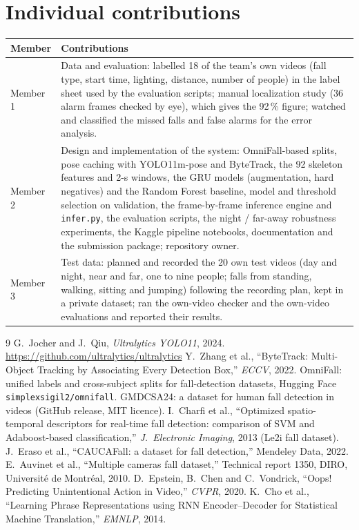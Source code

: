 \documentclass[11pt,a4paper]{article}
\newcommand{\code}[1]{\texttt{\small #1}}
\begin{document}
\section{Individual contributions}
\begin{table}[H]\centering\small
\begin{tabularx}{\textwidth}{@{}lX@{}}\toprule
\textbf{Member} & \textbf{Contributions}\\ \midrule
Member 1 & Data and evaluation: labelled 18 of the team's own videos (fall type, start time, lighting, distance, number of people) in the label sheet used by the evaluation scripts; manual localization study (36 alarm frames checked by eye), which gives the 92\,\% figure; watched and classified the missed falls and false alarms for the error analysis.\\[2pt]
Member 2 & Design and implementation of the system: OmniFall-based splits, pose caching with YOLO11m-pose and ByteTrack, the 92 skeleton features and 2-s windows, the GRU models (augmentation, hard negatives) and the Random Forest baseline, model and threshold selection on validation, the frame-by-frame inference engine and \code{infer.py}, the evaluation scripts, the night / far-away robustness experiments, the Kaggle pipeline notebooks, documentation and the submission package; repository owner.\\[2pt]
Member 3 & Test data: planned and recorded the 20 own test videos (day and night, near and far, one to nine people; falls from standing, walking, sitting and jumping) following the recording plan, kept in a private dataset; ran the own-video checker and the own-video evaluations and reported their results.\\
\bottomrule\end{tabularx}
\end{table}

\begin{thebibliography}{9}\small
{} G.~Jocher and J.~Qiu, \emph{Ultralytics YOLO11}, 2024. \url{https://github.com/ultralytics/ultralytics}
 Y.~Zhang et al., ``ByteTrack: Multi-Object Tracking by Associating Every Detection Box,'' \emph{ECCV}, 2022.
 OmniFall: unified labels and cross-subject splits for fall-detection datasets, Hugging Face \code{simplexsigil2/omnifall}.
 GMDCSA24: a dataset for human fall detection in videos (GitHub release, MIT licence).
 I.~Charfi et al., ``Optimized spatio-temporal descriptors for real-time fall detection: comparison of SVM and Adaboost-based classification,'' \emph{J.\ Electronic Imaging}, 2013 (Le2i fall dataset).
 J.~Eraso et al., ``CAUCAFall: a dataset for fall detection,'' Mendeley Data, 2022.
 E.~Auvinet et al., ``Multiple cameras fall dataset,'' Technical report 1350, DIRO, Université de Montréal, 2010.
 D.~Epstein, B.~Chen and C.~Vondrick, ``Oops! Predicting Unintentional Action in Video,'' \emph{CVPR}, 2020.
 K.~Cho et al., ``Learning Phrase Representations using RNN Encoder--Decoder for Statistical Machine Translation,'' \emph{EMNLP}, 2014.
\end{thebibliography}
\end{document}

